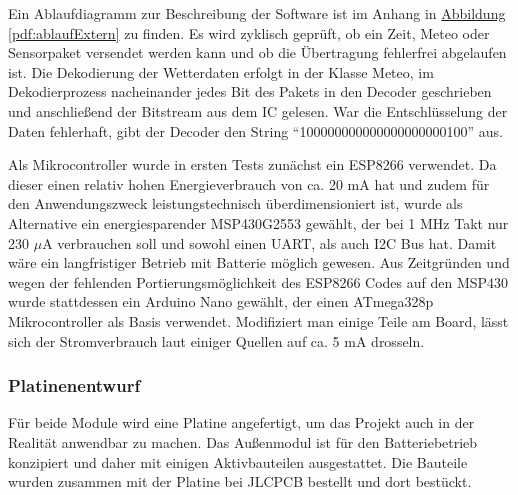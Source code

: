 \documentclass[a4paper,11pt]{article}
\newcounter{subsubsubsection}[subsubsection]
\begin{document}
\vspace{0.2cm}
\noindent
Ein Ablaufdiagramm zur Beschreibung der Software ist im Anhang in \hyperref[pdf:ablaufExtern]{Abbildung \ref{pdf:ablaufExtern}} zu finden. Es wird zyklisch geprüft, ob ein Zeit, Meteo oder Sensorpaket
versendet werden kann und ob die Übertragung fehlerfrei abgelaufen ist. Die Dekodierung der Wetterdaten erfolgt in der Klasse Meteo, im Dekodierprozess nacheinander
jedes Bit des Pakets in den Decoder geschrieben und anschließend der Bitstream aus dem IC gelesen. War die Entschlüsselung der Daten fehlerhaft, gibt der Decoder den String
``100000000000000000000100'' aus. 

\vspace{0.2cm}
\noindent
Als Mikrocontroller wurde in ersten Tests zunächst ein ESP8266 verwendet. Da dieser einen relativ hohen Energieverbrauch von ca. 20 mA hat und zudem für
den Anwendungszweck leistungstechnisch überdimensioniert ist, wurde als Alternative ein energiesparender MSP430G2553 gewählt, der bei 1 MHz Takt nur
230 $\mu$A verbrauchen soll und sowohl einen UART, als auch I2C Bus hat. Damit wäre ein langfristiger Betrieb mit Batterie möglich gewesen. 
Aus Zeitgründen und wegen der fehlenden Portierungsmöglichkeit des ESP8266 Codes auf den MSP430 wurde stattdessen ein Arduino Nano gewählt, der einen ATmega328p
Mikrocontroller als Basis verwendet. Modifiziert man einige Teile am Board, lässt sich der Stromverbrauch laut einiger Quellen auf ca. 5 mA drosseln. 

\subsubsection{Platinenentwurf}
\label{subsubsub:platinenentwurfExtern}

Für beide Module wird eine Platine angefertigt, um das Projekt auch in der Realität anwendbar zu machen. Das Außenmodul ist für den Batteriebetrieb konzipiert
und daher mit einigen Aktivbauteilen ausgestattet. Die Bauteile wurden zusammen mit der Platine bei JLCPCB bestellt und dort bestückt. 

\label{subsubsubsub:schaltplanExtern}
\end{document}
